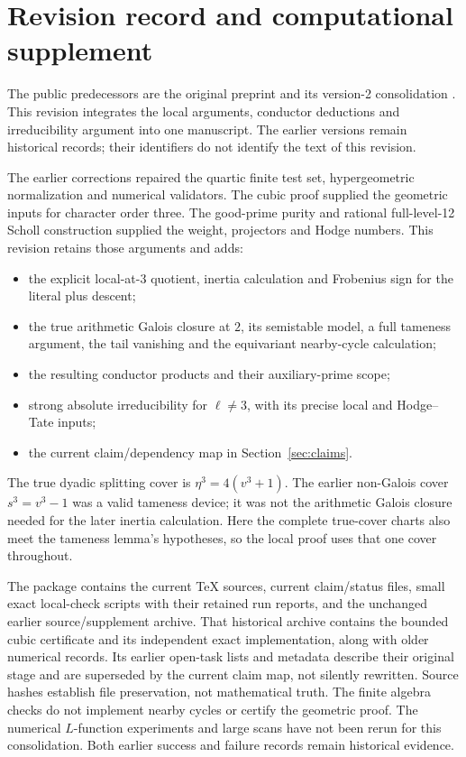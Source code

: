 \section*{Revision record and computational supplement}
The public predecessors are the original preprint \cite{WalkeV1} and
its version-2 consolidation \cite{WalkeV2}. This revision integrates the
local arguments, conductor deductions and irreducibility argument into
one manuscript. The earlier versions remain historical records; their
identifiers do not identify the text of this revision.

The earlier corrections repaired the quartic finite test set,
hypergeometric normalization and numerical validators. The cubic proof
supplied the geometric inputs for character order three. The good-prime
purity and rational full-level-12 Scholl construction supplied the weight,
projectors and Hodge numbers. This revision retains those arguments and adds:
\begin{itemize}
\item the explicit local-at-$3$ quotient, inertia calculation and
Frobenius sign for the literal plus descent;
\item the true arithmetic Galois closure at $2$, its semistable model,
a full tameness argument, the tail vanishing and the equivariant
nearby-cycle calculation;
\item the resulting conductor products and their auxiliary-prime scope;
\item strong absolute irreducibility for $\ell\ne3$, with its precise
local and Hodge--Tate inputs;
\item the current claim/dependency map in Section~\ref{sec:claims}.
\end{itemize}
The true dyadic splitting cover is $\eta^3=4(v^3+1)$. The earlier
non-Galois cover $s^3=v^3-1$ was a valid tameness device; it was not the
arithmetic Galois closure needed for the later inertia calculation.
Here the complete true-cover charts also meet the tameness lemma's
hypotheses, so the local proof uses that one cover throughout.

The package contains the current TeX sources, current claim/status files,
small exact local-check scripts with their retained run reports, and the
unchanged earlier source/supplement archive. That historical archive
contains the bounded cubic certificate and its independent exact
implementation, along with older numerical records. Its earlier open-task
lists and metadata describe their original stage and are superseded by
the current claim map, not silently rewritten. Source hashes establish
file preservation, not mathematical truth.
The finite algebra checks do not implement nearby cycles or certify the
geometric proof. The numerical $L$-function experiments and large scans
have not been rerun for this consolidation. Both earlier success and
failure records remain historical evidence.


